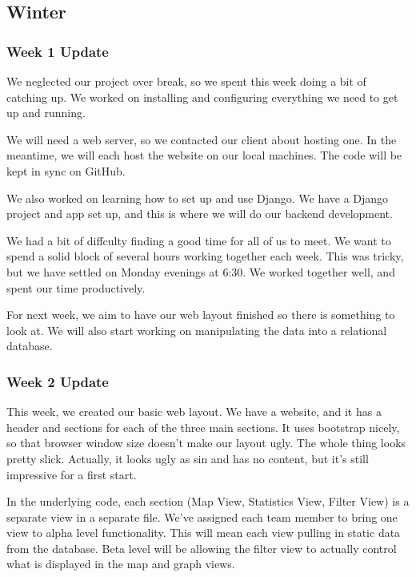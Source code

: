 \subsection{Winter}

\subsubsection{Week 1 Update}
We neglected our project over break, so we spent this week doing a bit of catching up. 
We worked on installing and configuring everything we need to get up and running.

We will need a web server, so we contacted our client about hosting one. 
In the meantime, we will each host the website on our local machines. 
The code will be kept in sync on GitHub.

We also worked on learning how to set up and use Django. 
We have a Django project and app set up, and this is where we will do our backend development.

We had a bit of diffculty finding a good time for all of us to meet. 
We want to spend a solid block of several hours working together each week. 
This was tricky, but we have settled on Monday evenings at 6:30. 
We worked together well, and spent our time productively.

For next week, we aim to have our web layout finished so there is something to look at. 
We will also start working on manipulating the data into a relational database.

\subsubsection{Week 2 Update}
This week, we created our basic web layout. 
We have a website, and it has a header and sections for each of the three main sections. 
It uses bootstrap nicely, so that browser window size doesn't make our layout ugly. 
The whole thing looks pretty slick. 
Actually, it looks ugly as sin and has no content, but it's still impressive for a first start.

In the underlying code, each ​section (Map View, Statistics View, Filter View) is a separate view in a separate file. 
We've assigned each team member to bring one view to alpha level functionality. 
This will mean each view pulling in static data from the database. 
Beta level will be allowing the filter view to actually control what is displayed in the map and graph views.

